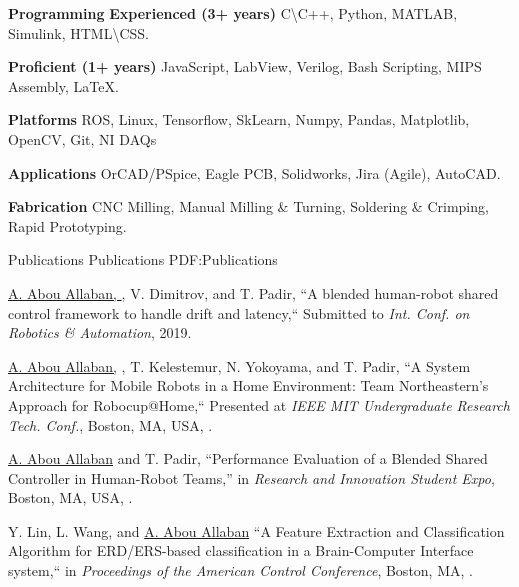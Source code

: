 \documentclass[letterpaper,MMMyyyy,nonstopmode]{simpleresumecv}
\begin{document}
\begin{Body}
\Entry
\textbf{Programming}
\BulletItem
\textbf{Experienced (3+ years)}
\newline
C\textbackslash C++, Python, MATLAB, Simulink, HTML\textbackslash CSS.

\BulletItem
\textbf{Proficient (1+ years)}
\newline
JavaScript,
LabView,
Verilog,
Bash Scripting,
MIPS Assembly,
{\LaTeX}.

\textbf{Platforms}
\newline
ROS, Linux, Tensorflow, SkLearn, Numpy, Pandas, Matplotlib, OpenCV,  Git, NI DAQs

\textbf{Applications}
\newline
OrCAD/PSpice, Eagle PCB, Solidworks, Jira (Agile), AutoCAD.

\textbf{Fabrication}
\newline
CNC Milling, Manual Milling \& Turning, Soldering \& Crimping, Rapid Prototyping.


\Section
{Publications}
{Publications}
{PDF:Publications}


\BigGap
\NumberedItem{[1]}
{\underline{A. Abou Allaban, }, V. Dimitrov, and T. Padir, 
``A blended human-robot shared control framework to handle drift and latency,``
Submitted to \textit{Int. Conf. on Robotics \& Automation}, 2019.}

\Gap
\NumberedItem{[2]}
{\underline{A. Abou Allaban,} , T. Kelestemur, N. Yokoyama, and T. Padir,
	``A System Architecture for Mobile Robots in a Home Environment: Team Northeastern’s Approach for Robocup@Home,``
	Presented at \textit{IEEE MIT Undergraduate Research Tech. Conf.}, 
	Boston, MA, USA,
	.}

\Gap
\NumberedItem{[3]}
{\underline{A. Abou Allaban} and T. Padir,
	``Performance Evaluation of a Blended Shared Controller in Human-Robot Teams,''
	in \textit{Research and Innovation Student Expo},
	Boston, MA, USA,
	.}

\Gap
\NumberedItem{[4]}
{Y. Lin, L. Wang, and \underline{A. Abou Allaban}
``A Feature Extraction and Classification Algorithm for ERD/ERS-based classification in a Brain-Computer Interface system,``
in \textit{Proceedings of the American Control Conference},
Boston, MA,
.}


\end{Body}
\end{document}
